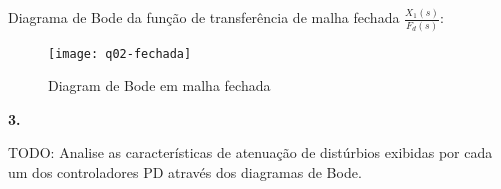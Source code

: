 \documentclass[a4paper,11pt]{article}
\begin{document}
Diagrama de Bode da função de transferência de malha fechada
$\frac{X_1\left(s\right)}{F_d\left(s\right)}$:

\begin{figure}[H]
\centering
\texttt{[image: q02-fechada]}
\caption{Diagram de Bode em malha fechada}
\end{figure}

\textbf{3.}

TODO: Analise as características de atenuação de distúrbios exibidas por cada um
dos controladores PD através dos diagramas de Bode.
\end{document}
